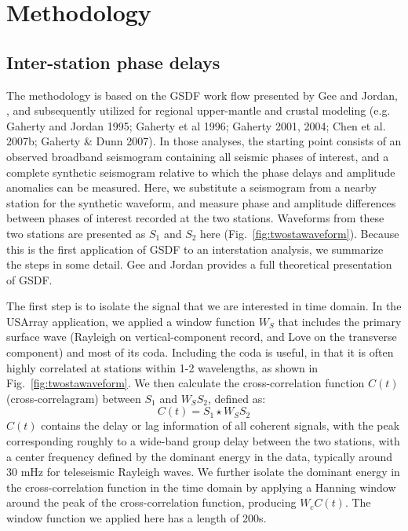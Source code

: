 \documentclass[referee]{gji}
\begin{document}
\section{Methodology}
\subsection{Inter-station phase delays}
\label{sec:gsdf}

The methodology is based on the GSDF work flow presented by Gee and Jordan, , and subsequently utilized for regional upper-mantle and crustal modeling (e.g. Gaherty and Jordan 1995; Gaherty et al 1996; Gaherty 2001, 2004; Chen et al. 2007b; Gaherty \& Dunn 2007).  In those analyses, the starting point consists of an observed broadband seismogram containing all seismic phases of interest, and a complete synthetic seismogram relative to which the phase delays and amplitude anomalies can be measured.  Here, we substitute a seismogram from a nearby station for the synthetic waveform, and measure phase and amplitude differences between phases of interest recorded at the two stations. Waveforms from these two stations are presented as $S_1$ and $S_2$ here (Fig.~\ref{fig:twostawaveform}). Because this is the first application of GSDF to an interstation analysis, we summarize the steps in some detail.  Gee and Jordan  provides a full theoretical presentation of GSDF. 


The first step is to isolate the signal that we are interested in time domain. In the USArray application, we applied a window function $W_S$ that includes the primary surface wave (Rayleigh on vertical-component record, and Love on the transverse component) and most of its coda. Including the coda is useful, in that it is often highly correlated at stations within 1-2 wavelengths, as shown in Fig.~\ref{fig:twostawaveform}. We then calculate the cross-correlation function $C(t)$ (cross-correlagram) between $S_1$ and $W_SS_2$, defined as:
\[
C(t) = S_1 \star W_S S_2
\]
$C(t)$ contains the delay or lag information of all coherent signals, with the peak corresponding roughly to a wide-band group delay between the two stations, with a center frequency defined by the dominant energy in the data, typically around 30 mHz for teleseismic Rayleigh waves. We further isolate the dominant energy in the cross-correlation function in the time domain by applying a Hanning window around the peak of the cross-correlation function, producing $W_cC(t)$. The window function we applied here has a length of 200s.
\end{document}
